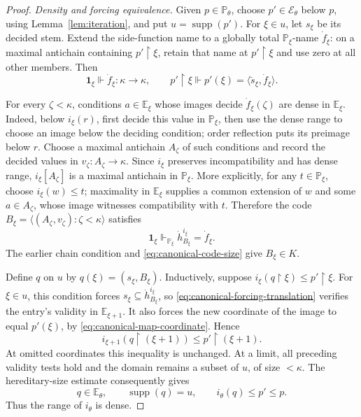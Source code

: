 \documentclass[10pt,a4paper]{amsart}
\theoremstyle{definition}
\theoremstyle{remark}
\newcommand{\PP}{\mathbb P}
\newcommand{\EE}{\mathbb E}
\DeclareMathOperator{\supp}{supp}
\begin{document}
\begin{proof}
\emph{Density and forcing equivalence.}
Given \(p\in\PP_\theta\), choose
\(p'\in\mathcal E_\theta\) below \(p\), using
Lemma~\ref{lem:iteration}, and put \(u=\supp(p')\).
For \(\xi\in u\), let \(s_\xi\) be its decided
stem. Extend the side-function name to a globally total
\(\PP_\xi\)-name \(\dot f_\xi\): on a maximal
antichain containing \(p'\restriction\xi\), retain
that name at \(p'\restriction\xi\) and use zero at
all other members. Then
\[
 \mathbf1_\xi\Vdash\dot f_\xi:\kappa\to\kappa,
 \qquad p'\restriction\xi\Vdash
          p'(\xi)=\langle\check s_\xi,\dot f_\xi\rangle.
\]

For every \(\zeta<\kappa\), conditions \(a\in\EE_\xi\)
whose images decide \(\dot f_\xi(\zeta)\) are dense
in \(\EE_\xi\). Indeed, below \(i_\xi(r)\),
first decide this value in \(\PP_\xi\), then use the
dense range to choose an image below the deciding
condition; order reflection puts its preimage below \(r\).
Choose a maximal antichain \(A_\zeta\) of such
conditions and record the decided values in
\(v_\zeta:A_\zeta\to\kappa\). Since \(i_\xi\)
preserves incompatibility and has dense range,
\(i_\xi[A_\zeta]\) is a maximal antichain in
\(\PP_\xi\). More explicitly, for any
\(t\in\PP_\xi\), choose \(i_\xi(w)\leq t\);
maximality in \(\EE_\xi\) supplies a common extension
of \(w\) and some \(a\in A_\zeta\), whose image
witnesses compatibility with \(t\). Therefore the code
\(B_\xi=\langle(A_\zeta,v_\zeta):\zeta<\kappa\rangle\)
satisfies
\[
 \mathbf1_\xi\Vdash_{\PP_\xi}
                    \dot h_{B_\xi}^{i_\xi}=\dot f_\xi.
\]
The earlier chain condition and
\eqref{eq:canonical-code-size} give \(B_\xi\in K\).

Define \(q\) on \(u\) by \(q(\xi)=(s_\xi,B_\xi)\).
Inductively, suppose
\(i_\xi(q\restriction\xi)\leq p'\restriction\xi\).
For \(\xi\in u\), this condition forces
\(s_\xi\subseteq\dot h_{B_\xi}^{i_\xi}\), so
\eqref{eq:canonical-forcing-translation} verifies the
entry's validity in \(\EE_{\xi+1}\). It also forces
the new coordinate of the image to equal \(p'(\xi)\),
by \eqref{eq:canonical-map-coordinate}. Hence
\[
 i_{\xi+1}(q\restriction(\xi+1))
                       \leq p'\restriction(\xi+1).
\]
At omitted coordinates this inequality is unchanged.
At a limit, all preceding validity tests hold and the
domain remains a subset of \(u\), of size \(<\kappa\).
The hereditary-size estimate consequently gives
\[
 q\in\EE_\theta,\qquad
 \supp(q)=u,\qquad i_\theta(q)\leq p'\leq p.
\]
Thus the range of \(i_\theta\) is dense.


\end{proof}
\end{document}
